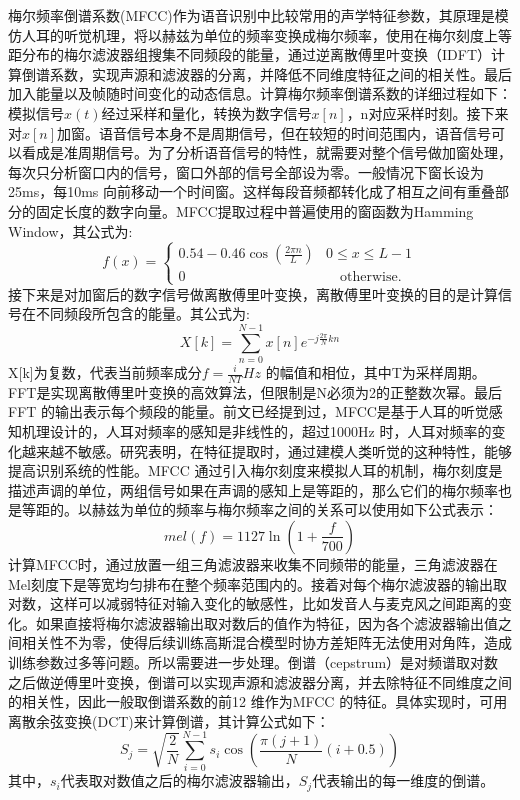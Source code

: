 梅尔频率倒谱系数(MFCC)作为语音识别中比较常用的声学特征参数，其原理是模仿人耳的听觉机理，将以赫兹为单位的频率变换成梅尔频率，使用在梅尔刻度上等距分布的梅尔滤波器组搜集不同频段的能量，通过逆离散傅里叶变换（IDFT）计算倒谱系数，实现声源和滤波器的分离，并降低不同维度特征之间的相关性。最后加入能量以及帧随时间变化的动态信息。计算梅尔频率倒谱系数的详细过程如下：模拟信号$x(t)$经过采样和量化，转换为数字信号$x[n]$，n对应采样时刻。接下来对$x[n]$加窗。语音信号本身不是周期信号，但在较短的时间范围内，语音信号可以看成是准周期信号。为了分析语音信号的特性，就需要对整个信号做加窗处理，每次只分析窗口内的信号，窗口外部的信号全部设为零。一般情况下窗长设为25ms，每10ms 向前移动一个时间窗。这样每段音频都转化成了相互之间有重叠部分的固定长度的数字向量。MFCC提取过程中普遍使用的窗函数为Hamming Window，其公式为:
\begin{equation}
  f(x)=
    \begin{cases}
      0.54 - 0.46\cos(\frac{2{\pi}n}{L}) & 0\leq x\leq L-1 \\
      \text{0} &\quad\text{otherwise.} \
    \end{cases}
\end{equation}
接下来是对加窗后的数字信号做离散傅里叶变换，离散傅里叶变换的目的是计算信号在不同频段所包含的能量。其公式为:\begin{equation}X[k]=\sum_{n=0}^{N-1} x[n]{e^{-j\frac{2\pi}{N}k{n}}}\end{equation}X[k]为复数，代表当前频率成分$f=\frac{i}{NT}Hz$ 的幅值和相位，其中T为采样周期。FFT是实现离散傅里叶变换的高效算法，但限制是N必须为2的正整数次幂。最后FFT 的输出表示每个频段的能量。前文已经提到过，MFCC是基于人耳的听觉感知机理设计的，人耳对频率的感知是非线性的，超过1000Hz 时，人耳对频率的变化越来越不敏感。研究表明，在特征提取时，通过建模人类听觉的这种特性，能够提高识别系统的性能\cite{davis1980comparison}。MFCC 通过引入梅尔刻度来模拟人耳的机制，梅尔刻度\cite{stevens1940}是描述声调的单位，两组信号如果在声调的感知上是等距的，那么它们的梅尔频率也是等距的。以赫兹为单位的频率与梅尔频率之间的关系可以使用如下公式表示：\begin{equation}mel(f)=1127\ln(1+\frac{f}{700})\end{equation}计算MFCC时，通过放置一组三角滤波器来收集不同频带的能量，三角滤波器在Mel刻度下是等宽均匀排布在整个频率范围内的。接着对每个梅尔滤波器的输出取对数，这样可以减弱特征对输入变化的敏感性，比如发音人与麦克风之间距离的变化。如果直接将梅尔滤波器输出取对数后的值作为特征，因为各个滤波器输出值之间相关性不为零，使得后续训练高斯混合模型时协方差矩阵无法使用对角阵，造成训练参数过多等问题。所以需要进一步处理。倒谱（cepstrum）是对频谱取对数之后做逆傅里叶变换，倒谱可以实现声源和滤波器分离，并去除特征不同维度之间的相关性，因此一般取倒谱系数的前12 维作为MFCC 的特征。具体实现时，可用离散余弦变换(DCT)来计算倒谱，其计算公式如下：\begin{equation}S_j=\sqrt{\frac{2}{N}}\sum_{i=0}^{N-1} s_i\cos(\frac{\pi({j+1})}{N}(i+0.5))\end{equation}其中，$s_i$代表取对数值之后的梅尔滤波器输出，$S_j$代表输出的每一维度的倒谱。
